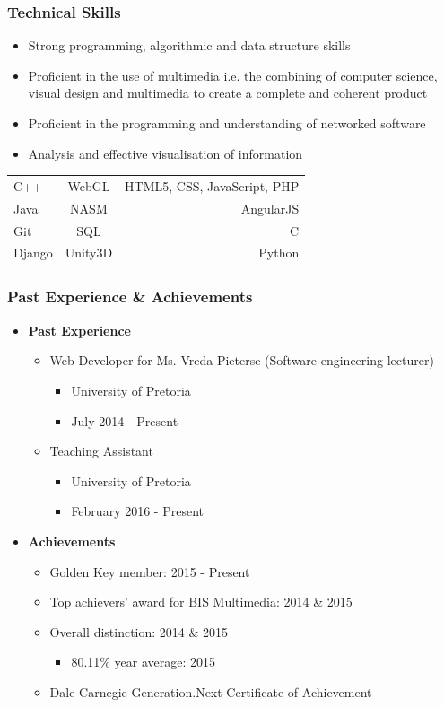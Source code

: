 \documentclass{article}
\begin{document}
	\subsubsection{Technical Skills}
		\begin{itemize}
			\item Strong programming, algorithmic and data structure skills
			\item Proficient in the use of multimedia i.e. the combining of computer science, visual design and multimedia to create a complete and coherent product
			\item Proficient in the programming and understanding of networked software
			\item Analysis and effective visualisation of information
		\end{itemize}
		\begin{tabular}{| l | c | r |}
			C++		& WebGL		& HTML5, CSS, JavaScript, PHP   	\\
			Java    & NASM     	& AngularJS							\\
			Git 	& SQL     	& C									\\
			Django 	& Unity3D 	& Python                     
		\end{tabular}
		
	\subsubsection{Past Experience \& Achievements}
		\begin{itemize}
			\item \textbf{Past Experience}
			\begin{itemize}
				\item Web Developer for Ms. Vreda Pieterse (Software engineering lecturer)
				\begin{itemize}
					\item University of Pretoria
					\item July 2014 - Present
				\end{itemize}
				\item Teaching Assistant
				\begin{itemize}
					\item University of Pretoria
					\item February 2016 - Present
				\end{itemize}
			\end{itemize}
			
			\item \textbf{Achievements}
			\begin{itemize}
				\item Golden Key member: 2015 - Present
				\item Top achievers' award for BIS Multimedia: 2014 \& 2015
				\item Overall distinction: 2014 \& 2015
				\begin{itemize}
					\item 80.11\% year average: 2015
				\end{itemize}
				\item Dale Carnegie Generation.Next Certificate of Achievement
			\end{itemize}
		\end{itemize}
		
\end{document}
